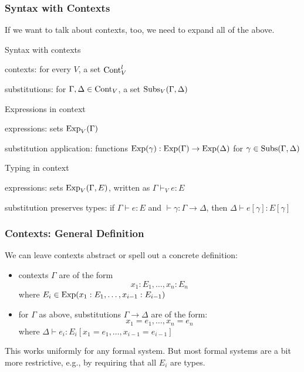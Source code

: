 \begin{frame}\frametitle{Syntax with Contexts}
If we want to talk about contexts, too, we need to expand all of the above.

\begin{blockitems}{Syntax with contexts}
\item contexts: for every $V$, a set $\mathrm{Cont}^l_V$
\item substitutions: for $\Gamma,\Delta\in\mathrm{Cont}_V$, a set $\mathrm{Subs}_V(\Gamma,\Delta)$
\end{blockitems}

\begin{blockitems}{Expressions in context}
\item expressions: sets $\mathrm{Exp}_V(\Gamma)$
\item substitution application: functions $\mathrm{Exp}(\gamma):\mathrm{Exp}(\Gamma)\to\mathrm{Exp}(\Delta)$ for $\gamma\in\mathrm{Subs}(\Gamma,\Delta)$
\end{blockitems}

\begin{blockitems}{Typing in context}
\item expressions: sets $\mathrm{Exp}_V(\Gamma,E)$, written as $\Gamma\vdash_V e: E$
\item substitution preserves types: if $\Gamma\vdash e:E$ and $\vdash \gamma:\Gamma\to\Delta$, then $\Delta\vdash e[\gamma]:E[\gamma]$
\end{blockitems}
\end{frame}

\begin{frame}\frametitle{Contexts: General Definition}
We can leave contexts abstract or spell out a concrete definition:
\begin{itemize}
\item contexts $\Gamma$ are of the form \[x_1:E_1,\ldots,x_n:E_n\]
 where $E_i\in\mathrm{Exp}(x_1:E_1,\ldots,x_{i-1}:E_{i-1})$
\item for $\Gamma$ as above, substitutions $\Gamma\to \Delta$ are of the form: \[x_1=e_1,\ldots,x_n=e_n\]
 where $\Delta\vdash e_i: E_i[x_1=e_1,\ldots,x_{i-1}=e_{i-1}]$
\end{itemize}
\medskip

This works uniformly for any formal system.
But most formal systems are a bit more restrictive, e.g., by requiring that all $E_i$ are types.
\end{frame}

